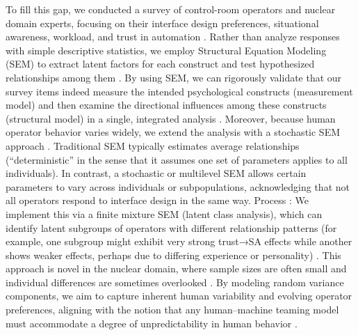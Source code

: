 \documentclass[conference]{IEEEtran}
\begin{document}
To fill this gap, we conducted a survey of control-room operators and nuclear domain experts, focusing on their interface design preferences, situational awareness, workload, and trust in automation \cite{nrc2016human, sciencedirect2025structural, nuclear2024analysis, oecd2016technical, iapsam2022human, revistanuclear2020licenciamiento, mdpi2025small, nrc2015smr}. Rather than analyze responses with simple descriptive statistics, we employ Structural Equation Modeling (SEM) to extract latent factors for each construct and test hypothesized relationships among them \cite{guilford2016principles, sciencedirect2021human, pmc2010neurophysiological, reliability2017structural, researchgate2002structural}. By using SEM, we can rigorously validate that our survey items indeed measure the intended psychological constructs (measurement model) and then examine the directional influences among these constructs (structural model) in a single, integrated analysis \cite{taylor1999cutoff, sciencedirect2025structural, pmc2010neurophysiological, frontiers2022closed, reliability2017structural}. Moreover, because human operator behavior varies widely, we extend the analysis with a stochastic SEM approach \cite{springer2002beyond, pmc2021influence, taylor2023structural, springer2025stochastic, researchgate2010optimal, mdpi2020functional}. Traditional SEM typically estimates average relationships (“deterministic” in the sense that it assumes one set of parameters applies to all individuals). In contrast, a stochastic or multilevel SEM allows certain parameters to vary across individuals or subpopulations, acknowledging that not all operators respond to interface design in the same way.
Process : 
We implement this via a finite mixture SEM (latent class analysis), which can identify latent subgroups of operators with different relationship patterns (for example, one subgroup might exhibit very strong trust→SA effects while another shows weaker effects, perhaps due to differing experience or personality) \cite{springer2002beyond, pmc2021influence, taylor2023structural, springer2025stochastic, researchgate2010optimal, mdpi2020functional, mdpi2023uav, nature2025situational, harvard2025paper}. This approach is novel in the nuclear domain, where sample sizes are often small and individual differences are sometimes overlooked \cite{nuclear2024analysis, taylor2023structural, frontiers2022closed, reliability2017structural, researchgate2002structural, mdpi2023mathematical}. By modeling random variance components, we aim to capture inherent human variability and evolving operator preferences, aligning with the notion that any human–machine teaming model must accommodate a degree of unpredictability in human behavior \cite{sciencedirect2015situation, sciencedirect2015measuring, pubmed2024effects, sage1995toward, researchgate2010optimal, mdpi2020functional, reddit2025solving, pmc2023effects, mdpi2023algorithms, openreview2025review}.
\end{document}
